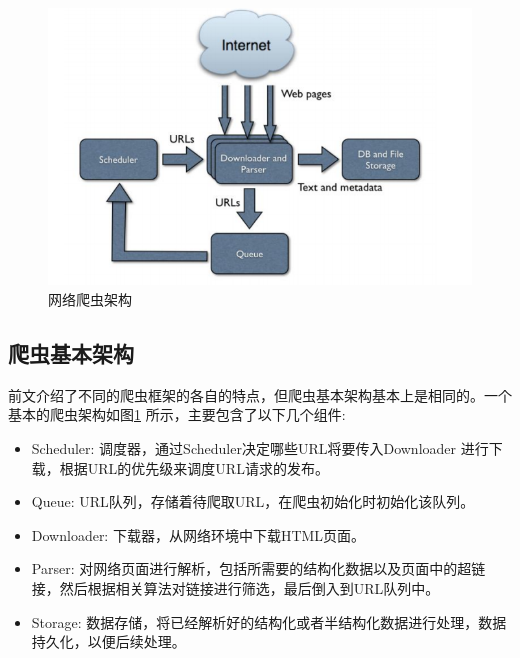 \documentclass[master]{njuthesis}
\begin{document}
\begin{figure}[htbp]
\centering
\includegraphics{pic/crawler-architecture.png}
\caption{网络爬虫架构}\label{fig:archetecture}
\end{figure}

\subsection{爬虫基本架构}\label{architecture}
前文介绍了不同的爬虫框架的各自的特点，但爬虫基本架构基本上是相同的。一个基本的爬虫架构如图\ref{fig:archetecture} 所示，主要包含了以下几个组件\cite{kausar2013web}:
\begin{itemize}
  \item Scheduler: 调度器，通过Scheduler决定哪些URL将要传入Downloader 进行下载，根据URL的优先级来调度URL请求的发布。
  \item Queue: URL队列，存储着待爬取URL，在爬虫初始化时初始化该队列。
  \item Downloader: 下载器，从网络环境中下载HTML页面。
  \item Parser: 对网络页面进行解析，包括所需要的结构化数据以及页面中的超链接，然后根据相关算法对链接进行筛选，最后倒入到URL队列中。
  \item Storage: 数据存储，将已经解析好的结构化或者半结构化数据进行处理，数据持久化，以便后续处理。
\end{itemize}
\end{document}
